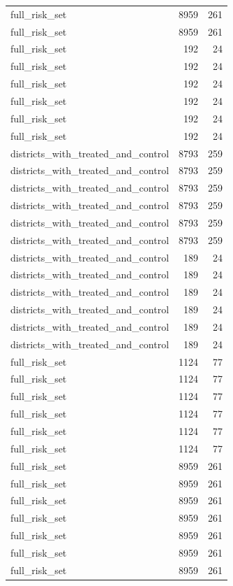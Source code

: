 \begin{table}[!htbp]
\begin{tabular}{lrr}
full\_risk\_set & 8959 & 261 \\
full\_risk\_set & 8959 & 261 \\
full\_risk\_set & 192 & 24 \\
full\_risk\_set & 192 & 24 \\
full\_risk\_set & 192 & 24 \\
full\_risk\_set & 192 & 24 \\
full\_risk\_set & 192 & 24 \\
full\_risk\_set & 192 & 24 \\
districts\_with\_treated\_and\_control & 8793 & 259 \\
districts\_with\_treated\_and\_control & 8793 & 259 \\
districts\_with\_treated\_and\_control & 8793 & 259 \\
districts\_with\_treated\_and\_control & 8793 & 259 \\
districts\_with\_treated\_and\_control & 8793 & 259 \\
districts\_with\_treated\_and\_control & 8793 & 259 \\
districts\_with\_treated\_and\_control & 189 & 24 \\
districts\_with\_treated\_and\_control & 189 & 24 \\
districts\_with\_treated\_and\_control & 189 & 24 \\
districts\_with\_treated\_and\_control & 189 & 24 \\
districts\_with\_treated\_and\_control & 189 & 24 \\
districts\_with\_treated\_and\_control & 189 & 24 \\
full\_risk\_set & 1124 & 77 \\
full\_risk\_set & 1124 & 77 \\
full\_risk\_set & 1124 & 77 \\
full\_risk\_set & 1124 & 77 \\
full\_risk\_set & 1124 & 77 \\
full\_risk\_set & 1124 & 77 \\
full\_risk\_set & 8959 & 261 \\
full\_risk\_set & 8959 & 261 \\
full\_risk\_set & 8959 & 261 \\
full\_risk\_set & 8959 & 261 \\
full\_risk\_set & 8959 & 261 \\
full\_risk\_set & 8959 & 261 \\
full\_risk\_set & 8959 & 261 \\

\end{tabular}
\end{table}
